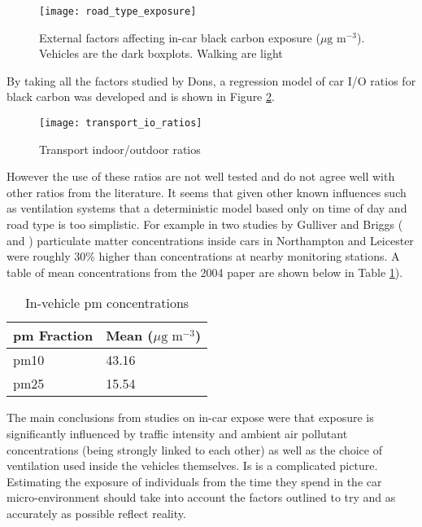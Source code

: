 \begin{figure}[H]
\centering
\texttt{[image: road\_type\_exposure]}
\caption{External factors affecting in-car black carbon exposure ($\mu \text{g m}^{-3}$). Vehicles are the dark boxplots. Walking are light}
\label{fig:road_type_exposure}
\end{figure}

By taking all the factors studied by Dons, a regression model of car I/O ratios for black carbon was developed and is shown in Figure \ref{fig:transport_io_ratios}.

\begin{figure}[H]
\centering
\texttt{[image: transport\_io\_ratios]}
\caption{Transport indoor/outdoor ratios}
\label{fig:transport_io_ratios}
\end{figure}

However the use of these ratios are not well tested and do not agree well with other ratios from the literature. It seems that given other known influences such as ventilation systems that a deterministic model based only on time of day and road type is too simplistic. For example in two studies by Gulliver and Briggs (\cite{Gulliver2004} and \cite{Gulliver2007}) particulate matter concentrations inside cars in Northampton and Leicester were roughly 30\% higher than concentrations at nearby monitoring stations. A table of mean concentrations from the 2004 paper are shown below in Table \ref{tab:gulliver_vehicle_means2}).

\begin{table}[H]
\caption{In-vehicle \gls{pm} concentrations}
\centering
    \begin{tabular}{ | l | l |}
    \hline 
     \bfseries{\gls{pm} Fraction} & \bfseries{Mean ($\mu \text{g m}^{-3}$)} \\ \hline
     \gls{pm10} & 43.16\\ \hline
     \gls{pm25} & 15.54\\ \hline
    \end{tabular}
\label{tab:gulliver_vehicle_means2}
\end{table}

The main conclusions from studies on in-car expose were that exposure is significantly influenced by traffic intensity and ambient air pollutant concentrations (being strongly linked to each other) as well as the choice of ventilation used inside the vehicles themselves. Is is a complicated picture. Estimating the exposure of individuals from the time they spend in the car micro-environment should take into account the factors outlined to try and as accurately as possible reflect reality.

